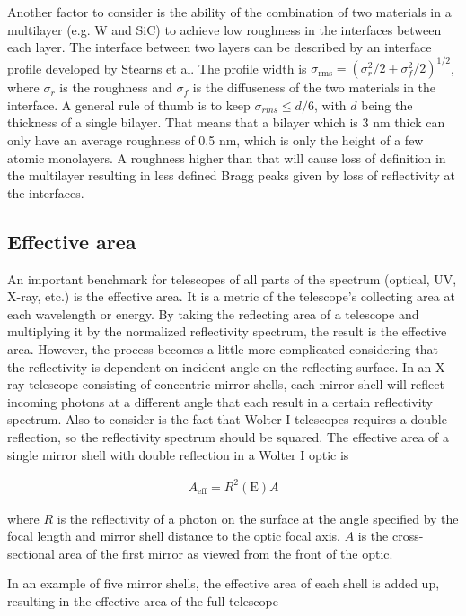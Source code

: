 Another factor to consider is the ability of the combination of two materials in a multilayer (e.g. W and SiC) to achieve low roughness in the interfaces between each layer. The interface between two layers can be described by an interface profile developed by Stearns et al\cite{Stearns:1989va}. The profile width is $\sigma_{\text{rms}}=(\sigma_r^2/2 + \sigma_f^2/2)^{1/2}$, where $\sigma_r$ is the roughness and $\sigma_f$ is the diffuseness of the two materials in the interface. A general rule of thumb is to keep $\sigma_{rms} \leq d/6$, with $d$ being the thickness of a single bilayer. That means that a bilayer which is 3 nm thick can only have an average roughness of 0.5 nm, which is only the height of a few atomic monolayers. A roughness higher than that will cause loss of definition in the multilayer resulting in less defined Bragg peaks given by loss of reflectivity at the interfaces.

\subsection{Effective area}\label{sec:eff_area}
An important benchmark for telescopes of all parts of the spectrum (optical, UV, X-ray, etc.) is the effective area. It is a metric of the telescope's collecting area at each wavelength or energy. By taking the reflecting area of a telescope and multiplying it by the normalized reflectivity spectrum, the result is the effective area. However, the process becomes a little more complicated considering that the reflectivity is dependent on incident angle on the reflecting surface. In an X-ray telescope consisting of concentric mirror shells, each mirror shell will reflect incoming photons at a different angle that each result in a certain reflectivity spectrum. Also to consider is the fact that Wolter I telescopes requires a double reflection, so the reflectivity spectrum should be squared. The effective area of a single mirror shell with double reflection in a Wolter I optic is

\begin{eqnarray}
	A_{\text{eff}} = R^2(\text{E}) A
\end{eqnarray}

where $R$ is the reflectivity of a photon on the surface at the angle specified by the focal length and mirror shell distance to the optic focal axis. $A$ is the cross-sectional area of the first mirror as viewed from the front of the optic.

In an example of five mirror shells, the effective area of each shell is added up, resulting in the effective area of the full telescope

